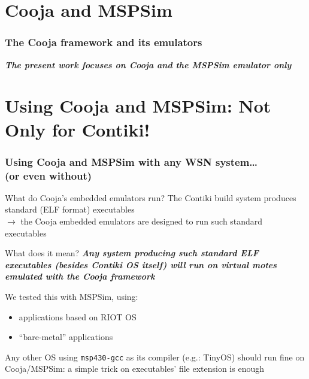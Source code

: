 \documentclass[10pt,c]{beamer}
\renewcommand{\emph}[1]{\textbf{\textit{#1}}}
\begin{document}

\section{Cooja and MSPSim}

\begin{frame}
\vspace{-0.5cm}
\frametitle{The Cooja framework and its emulators}

\vspace{0.25cm}
\begin{block}{}
\emph{The present work focuses on Cooja and the MSPSim emulator only}
\end{block}
\end{frame}


\section{Using Cooja and MSPSim: Not Only for Contiki!}

\begin{frame}
\frametitle{Using Cooja and MSPSim with any WSN system\ldots \\
            (or even without)}
\begin{block}{What do Cooja's embedded emulators run?}
\small
The Contiki build system produces standard (ELF format) executables \\
$\rightarrow$ the Cooja embedded emulators are designed to run such
standard executables
\end{block}
\begin{exampleblock}{What does it mean?}
\small
\emph{Any system producing such standard ELF executables (besides Contiki
OS itself) will run on virtual motes emulated with the Cooja framework}

We tested this with MSPSim, using:
\begin{itemize}
\item applications based on RIOT OS
\item ``bare-metal'' applications
\end{itemize}

Any other OS using \texttt{msp430-gcc} as its compiler (e.g.: TinyOS)
should run fine on Cooja/MSPSim: a simple trick on executables' file
extension is enough
\end{exampleblock}
\end{frame}
\end{document}
